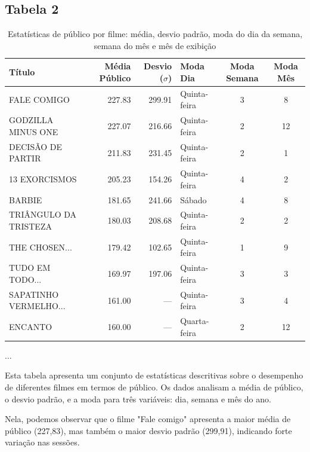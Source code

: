 \documentclass{article}
\begin{document}
\pagebreak
\subsection*{Tabela 2}

\begin{table}[H]
\centering
\caption{Estatísticas de público por filme: média, desvio padrão, moda do dia da semana, semana do mês e mês de exibição}
\begin{small}
\begin{tabularx}{\textwidth}{X r r l c c}
\hline
\textbf{Título} & \textbf{Média Público} & \textbf{Desvio ($\sigma$)} & \textbf{Moda Dia} & \textbf{Moda Semana} & \textbf{Moda Mês} \\
\hline
FALE COMIGO & 227.83 & 299.91 & Quinta-feira & 3 & 8 \\
GODZILLA MINUS ONE & 227.07 & 216.66 & Quinta-feira & 2 & 12 \\
DECISÃO DE PARTIR & 211.83 & 231.45 & Quinta-feira & 2 & 1 \\
13 EXORCISMOS & 205.23 & 154.26 & Quinta-feira & 4 & 2 \\
BARBIE & 181.65 & 241.66 & Sábado & 4 & 8 \\
TRIÂNGULO DA TRISTEZA & 180.03 & 208.68 & Quinta-feira & 2 & 2 \\
THE CHOSEN... & 179.42 & 102.65 & Quinta-feira & 1 & 9 \\
TUDO EM TODO... & 169.97 & 197.06 & Quinta-feira & 3 & 3 \\
SAPATINHO VERMELHO... & 161.00 & --- & Quinta-feira & 3 & 4 \\
ENCANTO & 160.00 & --- & Quarta-feira & 2 & 12 \\

\end{tabularx}
\end{small}
\begin{center}
$\ldots$
\end{center}
\end{table}

Esta tabela apresenta um conjunto de estatísticas descritivas sobre o desempenho de diferentes 
filmes em termos de público. Os dados analisam a média de público, o desvio padrão, e a moda para três variáveis: dia, semana e mês do ano.

Nela, podemos observar que o filme "Fale comigo" apresenta a maior média de público (227,83), mas 
também o maior desvio padrão (299,91), indicando forte variação nas sessões.
\end{document}
